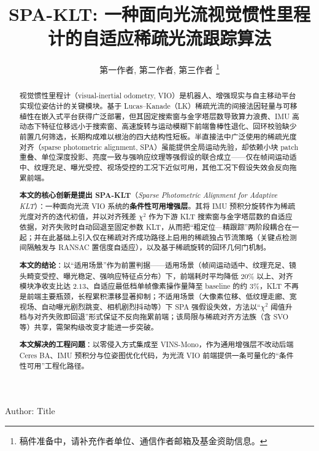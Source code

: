 \documentclass[letterpaper,journal]{IEEEtran}
\begin{document}
\title{SPA-KLT: 一种面向光流视觉惯性里程计的自适应稀疏光流跟踪算法}

\author{
  第一作者,
  第二作者,
  第三作者%
  \thanks{稿件准备中，请补充作者单位、通信作者邮箱及基金资助信息。}
}

{Author: Title}

\maketitle

\begin{abstract}
视觉惯性里程计（visual-inertial odometry, VIO）是机器人、增强现实与自主移动平台实现位姿估计的关键模块。基于 Lucas--Kanade（LK）稀疏光流的间接法因轻量与可移植性在嵌入式平台获得广泛部署，但其固定搜索窗与金字塔层数导致算力浪费、IMU 高动态下特征位移远小于搜索窗、高速旋转与运动模糊下前端鲁棒性退化、回环校验缺少前置几何筛选，长期构成难以根治的四大结构性短板。半直接法中广泛使用的稀疏光度对齐（sparse photometric alignment, SPA）虽能提供全局运动先验，却依赖小块 patch 重叠、单位深度投影、亮度一致与强响应纹理等强假设的联合成立——仅在帧间运动适中、纹理充足、曝光受控、视场受控的工况下近似可用，其他工况下假设失效会反向拖累前端。

\textbf{本文的核心创新是提出 SPA-KLT}（\textit{Sparse Photometric Alignment for Adaptive KLT}）：一种面向光流 VIO 系统的\textbf{条件性可用增强层}。其将 IMU 预积分旋转作为稀疏光度对齐的迭代初值，并以对齐残差 $\chi^2$ 作为下游 KLT 搜索窗与金字塔层数的自适应依据，对齐失败时自动回退至固定参数 KLT，从而把``粗定位—精跟踪''两阶段耦合在一起；并在此基础上引入仅在稀疏对齐成功路径上启用的稀疏独占节流策略（关键点检测间隔触发与 RANSAC 置信度自适应），以及基于稀疏旋转的回环几何门机制。

\textbf{本文的结论}：以``适用场景''作为前置判据——适用场景（帧间运动适中、纹理充足、镜头畸变受控、曝光稳定、强响应特征点分布）下，前端耗时平均降低 $20\%$ 以上、对齐模块净收支比达 $2.13$、自适应最低档单帧像素操作量降至 baseline 的约 $3\%$，KLT 不再是前端主要瓶颈，长程累积漂移显著抑制；不适用场景（大像素位移、低纹理走廊、宽视场、自动曝光剧烈跳变、相机剧烈抖动等）下 SPA 强假设失效，方法以``$\chi^2$ 阈值升档与对齐失败即回退''形式保证不反向拖累前端；该局限与稀疏对齐方法族（含 SVO 等）共享，需架构级改变才能进一步突破。

\textbf{本文解决的工程问题}：以零侵入方式集成至 VINS-Mono，作为通用增强层不改动后端 Ceres BA、IMU 预积分与位姿图优化代码，为光流 VIO 前端提供一条可量化的``条件性可用''工程化路径。
\end{abstract}
\end{document}
